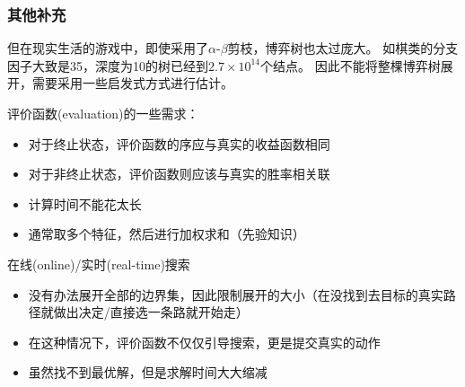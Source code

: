 \subsubsection{其他补充}
但在现实生活的游戏中，即使采用了$\alpha$-$\beta$剪枝，博弈树也太过庞大。
如棋类的分支因子大致是35，深度为10的树已经到$2.7\times 10^{14}$个结点。
因此不能将整棵博弈树展开，需要采用一些启发式方式进行估计。

评价函数(evaluation)的一些需求：
\begin{itemize}
	\item 对于终止状态，评价函数的序应与真实的收益函数相同
	\item 对于非终止状态，评价函数则应该与真实的胜率相关联
	\item 计算时间不能花太长
	\item 通常取多个特征，然后进行加权求和（先验知识）
\end{itemize}

在线(online)/实时(real-time)搜索
\begin{itemize}
	\item 没有办法展开全部的边界集，因此限制展开的大小（在没找到去目标的真实路径就做出决定/直接选一条路就开始走）
	\item 在这种情况下，评价函数不仅仅引导搜索，更是提交真实的动作
	\item 虽然找不到最优解，但是求解时间大大缩减
\end{itemize}